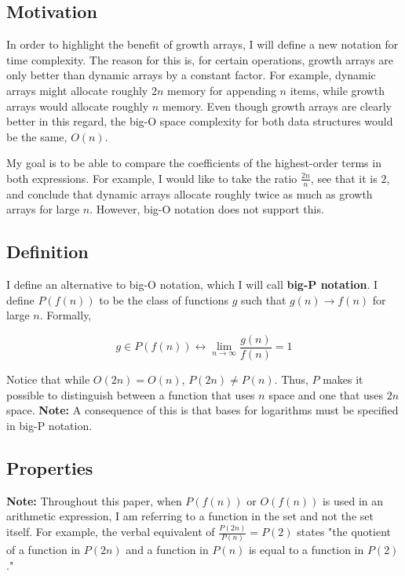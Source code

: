 \subsection{Motivation}

In order to highlight the benefit of growth arrays, I will define a new notation for time complexity. The reason for this is, for certain operations, growth arrays are only better than dynamic arrays by a constant factor. For example, dynamic arrays might allocate roughly $2n$ memory for appending $n$ items, while growth arrays would allocate roughly $n$ memory. Even though growth arrays are clearly better in this regard, the big-O space complexity for both data structures would be the same, $O(n)$.

My goal is to be able to compare the coefficients of the highest-order terms in both expressions. For example, I would like to take the ratio $\frac{2n}{n}$, see that it is $2$, and conclude that dynamic arrays allocate roughly twice as much as growth arrays for large $n$. However, big-O notation does not support this.

\subsection{Definition}

I define an alternative to big-O notation, which I will call \textbf{big-P notation}. I define $P(f(n))$ to be the class of functions $g$ such that $g(n) \to f(n)$ for large $n$. Formally,

$$
g \in P(f(n)) \leftrightarrow \lim_{n \to \infty} \frac{g(n)}{f(n)} = 1
$$

Notice that while $O(2n) = O(n)$, $P(2n) \neq P(n)$. Thus, $P$ makes it possible to distinguish between a function that uses $n$ space and one that uses $2n$ space. \textbf{Note:} A consequence of this is that bases for logarithms must be specified in big-P notation.

\subsection{Properties}
\label{BigPProperties}

\textbf{Note:} Throughout this paper, when $P(f(n))$ or $O(f(n))$ is used in an arithmetic expression, I am referring to a function in the set and not the set itself. For example, the verbal equivalent of $\frac{P(2n)}{P(n)} = P(2)$ states "the quotient of a function in $P(2n)$ and a function in $P(n)$ is equal to a function in $P(2)$."

